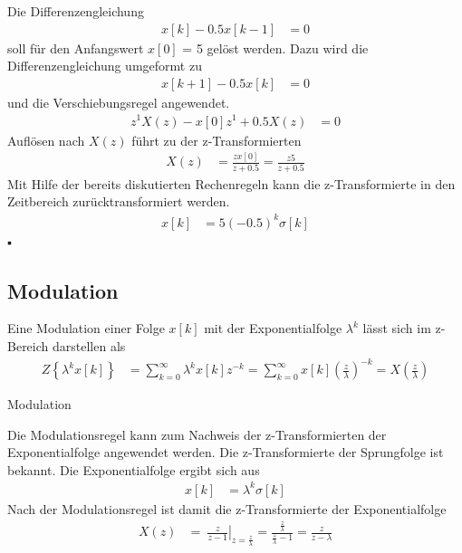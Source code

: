 Die Differenzengleichung
\begin{align}
x[ k] - 0.5  x[ k - 1] &= 0 \label{eq:5.46}
\end{align}
soll für den Anfangswert \(x[0]\) = 5 gelöst werden. Dazu wird die Differenzengleichung umgeformt zu
\begin{align}
x[ k + 1] - 0.5  x[ k] &= 0 \label{eq:5.47}
\end{align}
und die Verschiebungsregel angewendet.
\begin{align}
z^{1}  X(z) - x[ 0]  z^{1} + 0.5  X(z) &= 0 \label{eq:5.48}
\end{align}
Auflösen nach \(X(z)\) führt zu der z-Transformierten
\begin{align}
X(z) &= \frac{z  x[ 0]}{z + 0.5} = \frac{z  5}{z + 0.5} \label{eq:5.49}
\end{align}
Mit Hilfe der bereits diskutierten Rechenregeln kann die z-Transformierte in den Zeitbereich zurücktransformiert werden.
\begin{align}
x[ k] &= 5  ( - 0.5)^{k}  \sigma[ k] \label{eq:5.50}
\end{align}
▪

\subsection{Modulation}\label{sec:modulation}

Eine Modulation einer Folge \(x[k]\) mit der Exponentialfolge \(λ^{k}\) lässt sich im z-Bereich darstellen als
\begin{align}
Z\left\{ \lambda^{k}  x[ k] \right\} &= \sum\limits_{k = 0}^{\infty}{\lambda^{k}  x[ k]  z^{- k}} = \sum\limits_{k = 0}^{\infty}{x[ k]  \left( \frac{z}{\lambda} \right)^{- k}} = X\left( \frac{z}{\lambda} \right) \label{eq:5.51}
\end{align}
\begin{example}{Modulation}
\label{example:beispiel-modulation}

Die Modulationsregel kann zum Nachweis der z-Transformierten der Exponentialfolge angewendet werden. Die z-Transformierte der Sprungfolge ist bekannt. Die Exponentialfolge ergibt sich aus
\begin{align*}
x[ k] &= \lambda^{k}  \sigma[ k] 
\end{align*}
Nach der Modulationsregel ist damit die z-Transformierte der Exponentialfolge
\begin{align*}
X(z) &= \left. \ \frac{z}{z - 1} \right|_{z = \frac{z}{\lambda}} = \frac{\frac{z}{\lambda}}{\frac{z}{\lambda} - 1} = \frac{z}{z - \lambda} 
\end{align*}
\end{example}

